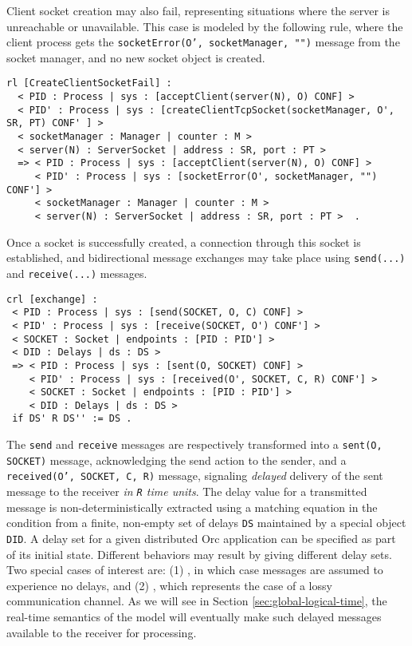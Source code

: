 \documentclass{eptcs}
\begin{document}
Client socket creation may also fail, representing situations where the server is unreachable or unavailable. This case is modeled by the following rule, where the client process gets the \texttt{socketError(O', socketManager, "")} message from the socket manager, and no new socket object is created.  
 
\begin{small}
\begin{verbatim}
rl [CreateClientSocketFail] : 
  < PID : Process | sys : [acceptClient(server(N), O) CONF] >
  < PID' : Process | sys : [createClientTcpSocket(socketManager, O', SR, PT) CONF' ] >
  < socketManager : Manager | counter : M >
  < server(N) : ServerSocket | address : SR, port : PT >
  => < PID : Process | sys : [acceptClient(server(N), O) CONF] >
     < PID' : Process | sys : [socketError(O', socketManager, "") CONF'] >
     < socketManager : Manager | counter : M >
     < server(N) : ServerSocket | address : SR, port : PT >  . 
\end{verbatim}
\end{small}
 
 
 
Once a socket is successfully created, a connection through this socket is established, and bidirectional message exchanges may take place using \texttt{send(...)} and \texttt{receive(...)} messages. 


\begin{small}
\begin{verbatim}
crl [exchange] : 
 < PID : Process | sys : [send(SOCKET, O, C) CONF] >
 < PID' : Process | sys : [receive(SOCKET, O') CONF'] >
 < SOCKET : Socket | endpoints : [PID : PID'] > 
 < DID : Delays | ds : DS > 
 => < PID : Process | sys : [sent(O, SOCKET) CONF] >
    < PID' : Process | sys : [received(O', SOCKET, C, R) CONF'] >
    < SOCKET : Socket | endpoints : [PID : PID'] > 
    < DID : Delays | ds : DS >
 if DS' R DS'' := DS .
\end{verbatim}
\end{small}

\noindent The \texttt{send} and \texttt{receive} messages are respectively transformed into a \texttt{sent(O, SOCKET)} message, acknowledging the send action to the sender, and a \texttt{received(O', SOCKET, C, R)} message, signaling \emph{delayed} delivery of the sent message to the receiver \emph{in \texttt{R}  time units}. The delay value for a transmitted message is non-deterministically extracted using a matching equation in the condition from a finite, non-empty set of delays \texttt{DS} maintained by a special object \texttt{DID}. A delay set for a given distributed Orc application can be specified as part of its initial state. Different behaviors may result by giving different delay sets. Two special cases of interest are: (1) , in which case messages are assumed to experience no delays, and (2) , which represents the case of a lossy communication channel. As we will see in Section \ref{sec:global-logical-time}, the real-time semantics of the model will eventually make such delayed messages available to the receiver for processing. 
\end{document}
